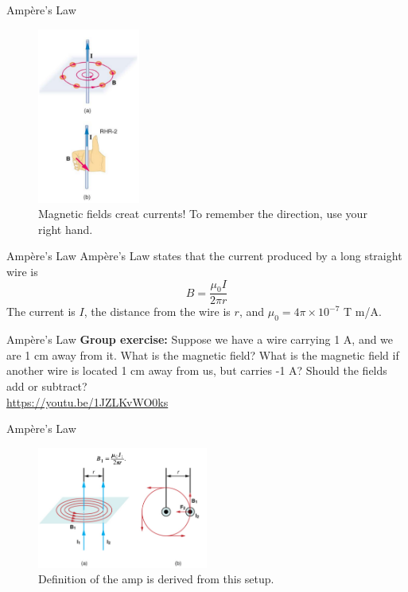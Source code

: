 \documentclass{beamer}
\begin{document}
\begin{frame}{Amp\`{e}re's Law}
\begin{figure}
\centering
\includegraphics[width=0.3\textwidth]{figures/rhr2.png}
\caption{\label{fig:amp} Magnetic fields creat currents!  To remember the direction, use your right hand.}
\end{figure}
\end{frame}

\begin{frame}{Amp\`{e}re's Law}
Amp\`{e}re's Law states that the current produced by a long straight wire is
\begin{equation}
B = \frac{\mu_0 I}{2\pi r}
\end{equation}
The current is $I$, the distance from the wire is $r$, and $\mu_0 = 4\pi \times 10^{-7}$ T m/A.
\end{frame}

\begin{frame}{Amp\`{e}re's Law}
\textbf{Group exercise:} Suppose we have a wire carrying 1 A, and we are 1 cm away from it.  What is the magnetic field?  What is the magnetic field if another wire is located 1 cm away from us, but carries -1 A? Should the fields add or subtract? \\ \vspace{1cm}
\url{https://youtu.be/1JZLKvWO0ks}
\end{frame}

\begin{frame}{Amp\`{e}re's Law}
\begin{figure}
\centering
\includegraphics[width=0.5\textwidth]{figures/amp.png}
\caption{\label{fig:amp} Definition of the amp is derived from this setup.}
\end{figure}
\end{frame}
\end{document}
